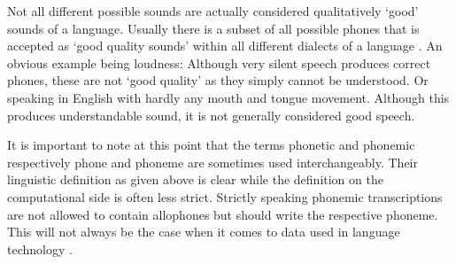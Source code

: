 Not all different possible sounds are actually considered qualitatively `good' sounds of a language. Usually there is a subset of all possible phones that is accepted as `good quality sounds' within all different dialects of a language \citep{Intro.2007}. An obvious example being loudness: Although very silent speech produces correct phones, these are not `good quality' as they simply cannot be understood. Or speaking in English with hardly any mouth and tongue movement. Although this produces understandable sound, it is not generally considered good speech. 

It is important to note at this point that the terms phonetic and phonemic respectively phone and phoneme are sometimes used interchangeably. Their linguistic definition as given above is clear while the definition on the computational side is often less strict. Strictly speaking phonemic transcriptions are not allowed to contain allophones but should write the respective phoneme. This will not always be the case when it comes to data used in language technology \citep{Lee&Ashby.2020}. 


